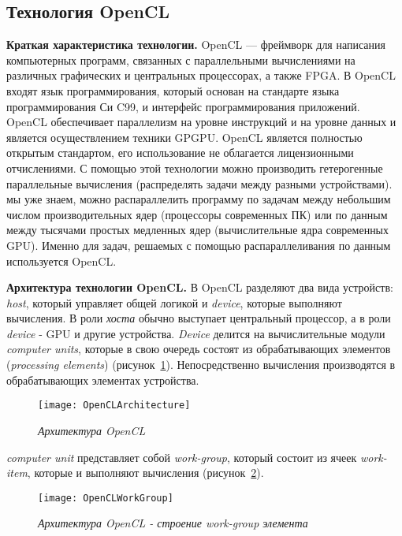 { %
	\subsection{Технология OpenCL}
	\label{OpenCL:section}
	\par\textbf{Краткая характеристика технологии.} OpenCL — фреймворк для написания компьютерных программ, связанных с параллельными вычислениями на различных графических и центральных процессорах, а также FPGA. В OpenCL входят язык программирования, который основан на стандарте языка программирования Си C99, и интерфейс программирования приложений. OpenCL обеспечивает параллелизм на уровне инструкций и на уровне данных и является осуществлением техники GPGPU. OpenCL является полностью открытым стандартом, его использование не облагается лицензионными отчислениями. С помощью этой технологии можно производить гетерогенные параллельные вычисления (распределять задачи между разными устройствами).
	 мы уже знаем, можно распараллелить программу по задачам между небольшим числом производительных ядер (процессоры современных ПК) или по данным между тысячами простых медленных ядер (вычислительные ядра современных GPU). Именно для задач, решаемых с помощью распараллеливания по данным используется OpenCL.
	\par\textbf{Архитектура технологии OpenCL.} В OpenCL разделяют два вида устройств: \textit{host}, который управляет общей логикой и \textit{device}, которые выполняют вычисления. В роли \textit{хоста} обычно выступает центральный процессор, а в роли \textit{device} - GPU и другие устройства. \textit{Device} делится на вычислительные модули \textit{computer units}, которые в свою очередь состоят из обрабатывающих элементов (\textit{processing elements}) (рисунок~\ref{OpenCLArchitecture:image}). Непосредственно вычисления  производятся  в  обрабатывающих  элементах устройства.
	\begin{figure}[H]
		\texttt{[image: OpenCLArchitecture]}
		\caption{\textit{Архитектура OpenCL}}
		\label{OpenCLArchitecture:image}
	\end{figure}
	 \textit{computer unit} представляет собой \textit{work-group}, который состоит из ячеек \textit{work-item}, которые и выполняют вычисления (рисунок~\ref{OpenCLWorkGroup:image}).
	\begin{figure}[H]
		\texttt{[image: OpenCLWorkGroup]}
		\caption{\textit{Архитектура OpenCL - строение work-group элемента}}
		\label{OpenCLWorkGroup:image}
	\end{figure}
}
